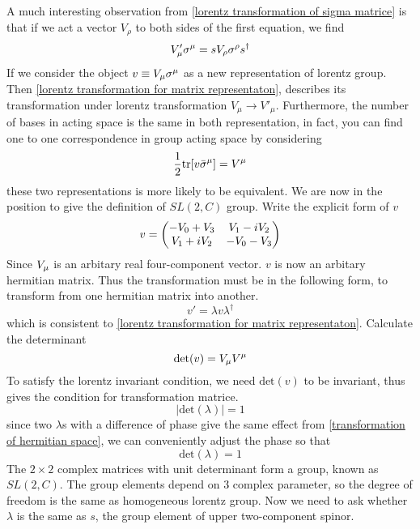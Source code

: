A much interesting observation from \eqref{lorentz transformation of sigma matrice} is that if we act a vector $V_{\rho}$ to both sides of the first equation, we find
\begin{equation}\label{lorentz transformation for matrix representaton}
  V'_{\mu}\sigma^{\mu} = s V_{\rho}\sigma^{\rho}{s}^{\dagger}
\end{equation}
If we consider the object $v\equiv V_\mu \sigma^{\mu}$ as a new representation of lorentz group. Then \eqref{lorentz transformation for matrix representaton}, describes its transformation under lorentz transformation $V_{\mu}\rightarrow V'_{\mu}$. 
Furthermore, the number of bases in acting space is the same in both representation, in fact, you can find one to one correspondence in group acting space by considering
\begin{equation}\label{reflection to the vector representation}
\frac{1}{2} \text{tr}[v\bar{\sigma}^{\mu}] = V^{\mu}
\end{equation}
these two representations is more likely to be equivalent.
We are now in the position to give the definition of $SL(2,C)$ group. Write the explicit form of $v$
\begin{equation}
v = \mqty(-V_0 +  V_3 & V_1 - i V_2
                   \\ V_1 +i V_2 & -V_0 -  V_3)
\end{equation}
Since $V_{\mu}$ is an arbitary real four-component vector.  $v$ is now an arbitary hermitian matrix. Thus the transformation must be in the following form, to transform from one hermitian matrix into another.
\begin{equation}\label{transformation of hermitian space}
v' = \lambda v \lambda^{\dagger}
\end{equation}
which is consistent to \eqref{lorentz transformation for matrix representaton}. Calculate the determinant
\begin{equation}
\text{det}(v) = V_\mu V^\mu 
\end{equation}
To satisfy the lorentz invariant condition, we need $\text{det}(v)$ to be invariant, thus gives the condition for transformation matrice.
\begin{equation}
|\text{det}(\lambda)| = 1
\end{equation}
since two $\lambda$s with a difference of phase give the same effect from \eqref{transformation of hermitian space}, we can conveniently adjust the phase so that
\begin{equation}\label{SL(2,C) condition}
\text{det}(\lambda) = 1
\end{equation}
The $2\times2$ complex matrices with unit determinant form a group, known as \textbf{$SL(2,C)$}. The group elements depend on 3 complex parameter, so the degree of freedom is the same as homogeneous lorentz group. Now we need to ask whether $\lambda$ is the same as $s$, the group element of upper two-component spinor. 

